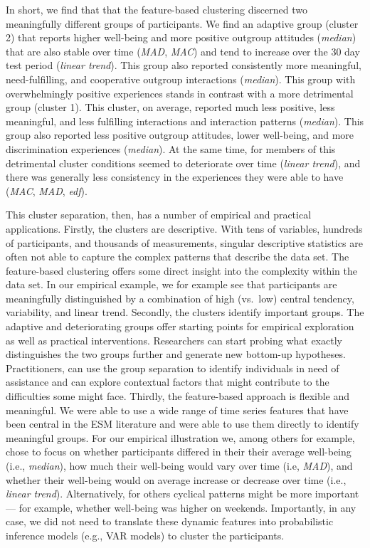 In short, we find that that the feature-based clustering discerned two
meaningfully different groups of participants. We find an adaptive group
(cluster 2) that reports higher well-being and more positive outgroup
attitudes (\textit{median}) that are also stable over time
(\textit{MAD}, \textit{MAC}) and tend to increase over the 30 day test
period (\textit{linear trend}). This group also reported consistently
more meaningful, need-fulfilling, and cooperative outgroup interactions
(\textit{median}). This group with overwhelmingly positive experiences
stands in contrast with a more detrimental group (cluster 1). This
cluster, on average, reported much less positive, less meaningful, and
less fulfilling interactions and interaction patterns (\textit{median}).
This group also reported less positive outgroup attitudes, lower
well-being, and more discrimination experiences (\textit{median}). At
the same time, for members of this detrimental cluster conditions seemed
to deteriorate over time (\textit{linear trend}), and there was
generally less consistency in the experiences they were able to have
(\textit{MAC}, \textit{MAD}, \textit{edf}).

This cluster separation, then, has a number of empirical and practical
applications. Firstly, the clusters are descriptive. With tens of
variables, hundreds of participants, and thousands of measurements,
singular descriptive statistics are often not able to capture the
complex patterns that describe the data set. The feature-based
clustering offers some direct insight into the complexity within the
data set. In our empirical example, we for example see that participants
are meaningfully distinguished by a combination of high (vs.~low)
central tendency, variability, and linear trend. Secondly, the clusters
identify important groups. The adaptive and deteriorating groups offer
starting points for empirical exploration as well as practical
interventions. Researchers can start probing what exactly distinguishes
the two groups further and generate new bottom-up hypotheses.
Practitioners, can use the group separation to identify individuals in
need of assistance and can explore contextual factors that might
contribute to the difficulties some might face. Thirdly, the
feature-based approach is flexible and meaningful. We were able to use a
wide range of time series features that have been central in the ESM
literature and were able to use them directly to identify meaningful
groups. For our empirical illustration we, among others for example,
chose to focus on whether participants differed in their their average
well-being (i.e., \textit{median}), how much their well-being would vary
over time (i.e, \textit{MAD}), and whether their well-being would on
average increase or decrease over time (i.e., \textit{linear trend}).
Alternatively, for others cyclical patterns might be more important ---
for example, whether well-being was higher on weekends. Importantly, in
any case, we did not need to translate these dynamic features into
probabilistic inference models (e.g., VAR models) to cluster the
participants.

